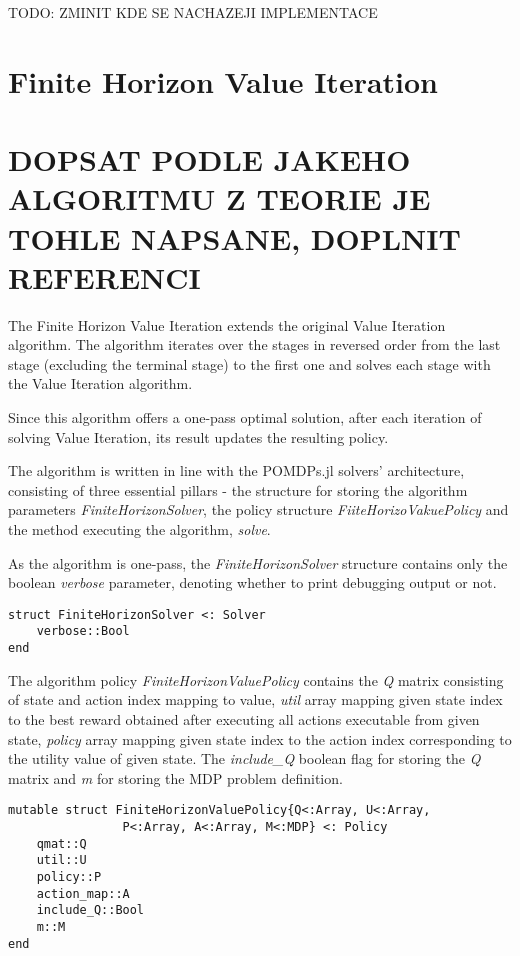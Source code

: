 TODO: ZMINIT KDE SE NACHAZEJI IMPLEMENTACE





\section{Finite Horizon Value Iteration}

\section{DOPSAT PODLE JAKEHO ALGORITMU Z TEORIE JE TOHLE NAPSANE, DOPLNIT REFERENCI}

The Finite Horizon Value Iteration extends the original Value Iteration algorithm. The algorithm iterates over the stages in reversed order from the last stage (excluding the terminal stage) to the first one and solves each stage with the Value Iteration algorithm.

Since this algorithm offers a one-pass optimal solution, after each iteration of solving Value Iteration, its result updates the resulting policy.

The algorithm is written in line with the POMDPs.jl solvers' architecture, consisting of three essential pillars - the structure for storing the algorithm parameters \textit{FiniteHorizonSolver}, the policy structure \textit{FiiteHorizoVakuePolicy} and the method executing the algorithm, \textit{solve}.

As the algorithm is one-pass, the \textit{FiniteHorizonSolver} structure contains only the boolean \textit{verbose} parameter, denoting whether to print debugging output or not.

\begin{verbatim}
struct FiniteHorizonSolver <: Solver 
    verbose::Bool 
end 
\end{verbatim}

The algorithm policy \textit{FiniteHorizonValuePolicy} contains the \textit{Q} matrix consisting of state and action index mapping to value, \textit{util} array mapping given state index to the best reward obtained after executing all actions executable from given state, \textit{policy} array mapping given state index to the action index corresponding to the utility value of given state. The \textit{include\_Q} boolean flag for storing the \textit{Q} matrix and \textit{m} for storing the MDP problem definition.


\begin{samepage}
\begin{verbatim}
mutable struct FiniteHorizonValuePolicy{Q<:Array, U<:Array, 
                P<:Array, A<:Array, M<:MDP} <: Policy
    qmat::Q
    util::U
    policy::P
    action_map::A
    include_Q::Bool
    m::M
end
\end{verbatim}
\end{samepage}

